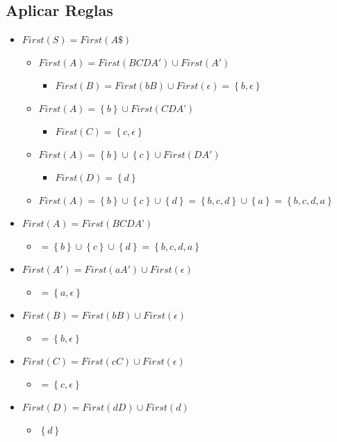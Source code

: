 \documentclass[12pt]{article}
\begin{document}
\subsection{Aplicar Reglas}
\begin{itemize}
    \item $First (S) = First (A\$)$
    \begin{itemize}
        \item $First (A) = First (BCDA') \cup First (A')$
     \begin{itemize}
         \item $First (B) = First (bB) \cup First (\epsilon) = \left \{ b, \epsilon \right \}$
     \end{itemize}
        \item $First (A) = \left \{b  \right \} \cup First (CDA’)$
        \begin{itemize}
            \item $First (C) = \left \{c, \epsilon \right \}$
        \end{itemize}
        \item $First (A) = \left \{b  \right \} \cup \left \{c  \right \} \cup First (DA')$
        \begin{itemize}
            \item $First (D) = \left \{d  \right \}$
        \end{itemize}
        \item $First (A) = \left \{b  \right \} \cup \left \{c  \right \} \cup \left \{d \right \} = \left \{b, c, d  \right \} \cup \left \{ a \right \} = \left \{b, c, d, a  \right \}$
    \end{itemize}
    \item $First (A) = First (BCDA’)$
    \begin{itemize}
        \item $= \left \{b  \right \} \cup \left \{c  \right \} \cup \left \{d \right \} = \left \{b, c, d, a  \right \}$
    \end{itemize}
    \item $First (A') = First(aA') \cup First(\epsilon)$
    \begin{itemize}
        \item $= \left \{a, \epsilon  \right \}$
    \end{itemize}
    \item $First (B) = First (bB) \cup First (\epsilon) $
    \begin{itemize}
        \item $= \left \{b, \epsilon  \right \}$
    \end{itemize}
    \item $First (C) = First (cC) \cup First (\epsilon)$
    \begin{itemize}
        \item $= \left \{c, \epsilon  \right \}$
    \end{itemize}
    \item $First (D) = First (dD) \cup First (d)$
    \begin{itemize}
        \item $\left \{d  \right \}$
    \end{itemize}
\end{itemize}
\end{document}
